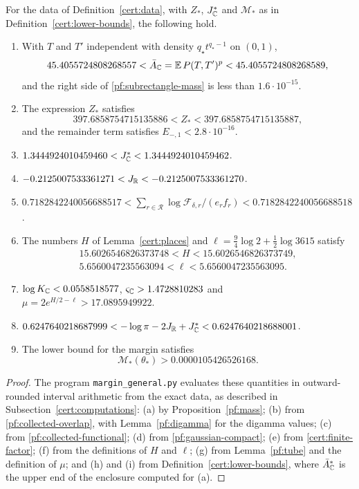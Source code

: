 \begin{proposition}\label{cert:enclosures}
For the data of Definition~\ref{cert:data}, with $Z_*$, $J_\mathbb C^*$ and
$\mathcal M_*$ as in Definition~\ref{cert:lower-bounds}, the following
hold.
\begin{enumerate}
\item[(a)] With $T$ and $T'$ independent with density $q_\star t^{q_\star-1}$ on
$(0,1)$,
\begin{equation}\label{cert:mass}
 45.4055724808268557<\bar A_\mathbb C=\mathbb E\,P(T,T')^p<45.4055724808268589 ,
\end{equation}
and the right side of \eqref{pf:subrectangle-mass} is less than
$1.6\cdot10^{-15}$.
\item[(b)] The expression $Z_*$ satisfies
\begin{equation}\label{cert:overlap}
 397.6858754715135886<Z_*<397.6858754715135887 ,
\end{equation}
and the remainder term satisfies $E_{-,1}<2.8\cdot10^{-16}$.
\item[(c)] $1.3444924010459460<J_\mathbb C^*<1.3444924010459462$.
\item[(d)] $-0.2125007533361271<J_\mathbb R<-0.2125007533361270$.
\item[(e)] $0.7182842240056688517<\sum_{r\in\mathcal R}\log\mathcal
F_{\delta,r}/(e_rf_r)<0.7182842240056688518$.
\item[(f)] The numbers $H$ of Lemma~\ref{cert:places} and
$\ell=\frac94\log2+\frac12\log3615$ satisfy
\begin{gather*}
 15.6026546826373748<H<15.6026546826373749,\\
 5.6560047235563094<\ell<5.6560047235563095 .
\end{gather*}
\item[(g)] $\log K_\mathbb C<0.0558518577$, $\varsigma_\mathbb C>1.4728810283$ and
$\mu=2e^{H/2-\ell}>17.0895949922$.
\item[(h)] $0.6247640218687999<-\log\pi-2J_\mathbb R+J_\mathbb C^*<0.6247640218688001$.
\item[(i)] The lower bound for the margin satisfies
\begin{equation}\label{cert:margin}
 \mathcal M_*(\theta_*)>0.0000105426526168 .
\end{equation}
\end{enumerate}
\end{proposition}

\begin{proof}
The program \texttt{margin\_general.py} evaluates these quantities in
outward-rounded interval arithmetic from the exact data, as described in
Subsection~\ref{cert:computations}: (a) by Proposition~\ref{pf:mass}; (b)
from \eqref{pf:collected-overlap}, with Lemma~\ref{pf:digamma} for the
digamma values; (c) from \eqref{pf:collected-functional}; (d) from
\eqref{pf:gaussian-compact}; (e) from \eqref{cert:finite-factor}; (f) from
the definitions of $H$ and $\ell$; (g) from Lemma~\ref{pf:tube} and the
definition of $\mu$; and (h) and (i) from
Definition~\ref{cert:lower-bounds}, where $\bar A_\mathbb C^*$ is the upper end of
the enclosure computed for (a).
\end{proof}


